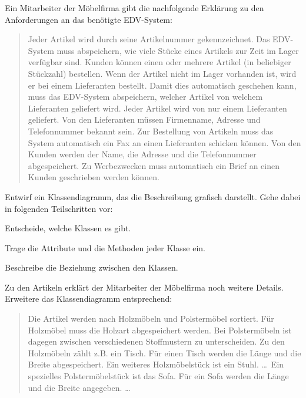 \begin{compactenum}[a)]
\item Ein Mitarbeiter der Möbelfirma gibt die nachfolgende Erklärung zu den
 Anforderungen an das benötigte EDV-System:

\begin{quotation}
\noindent Jeder Artikel wird durch seine Artikelnummer gekennzeichnet.
Das EDV-System muss abspeichern, wie viele Stücke eines Artikels zur Zeit im
Lager verfügbar sind. Kunden können einen oder mehrere Artikel (in beliebiger
Stückzahl) bestellen. Wenn der Artikel nicht im Lager vorhanden ist, wird er
bei einem Lieferanten bestellt. Damit dies automatisch geschehen kann, muss das
EDV-System abspeichern, welcher Artikel von welchem Lieferanten geliefert wird.
Jeder Artikel wird von nur einem Lieferanten geliefert. Von den Lieferanten
müssen Firmenname, Adresse und Telefonnummer bekannt sein. Zur Bestellung von
Artikeln muss das System automatisch ein Fax an einen Lieferanten schicken
können. Von den Kunden werden der Name, die Adresse und die Telefonnummer
abgespeichert. Zu Werbezwecken muss automatisch ein Brief an einen Kunden
geschrieben werden können.
\end{quotation}

Entwirf ein Klassendiagramm, das die Beschreibung grafisch darstellt. Gehe
dabei in folgenden Teilschritten vor:

\begin{compactenum}[1.]
\item Entscheide, welche Klassen es gibt.
\item Trage die Attribute und die Methoden jeder Klasse ein.
\item Beschreibe die Beziehung zwischen den Klassen.
\end{compactenum}

\item Zu den Artikeln erklärt der Mitarbeiter der Möbelfirma noch weitere
Details.  Erweitere das Klassendiagramm entsprechend:

\begin{quotation}
\noindent Die Artikel werden nach Holzmöbeln und Polstermöbel sortiert. Für
Holzmöbel muss die Holzart abgespeichert werden. Bei Polstermöbeln ist dagegen
zwischen verschiedenen Stoffmustern zu unterscheiden. Zu den Holzmöbeln zählt
z.B. ein Tisch. Für einen Tisch werden die Länge und die Breite abgespeichert.
Ein weiteres Holzmöbelstück ist ein Stuhl. \ldots\ Ein spezielles
Polstermöbelstück ist das Sofa. Für ein Sofa werden die Länge und die Breite
angegeben. \ldots
\end{quotation}
\end{compactenum}




